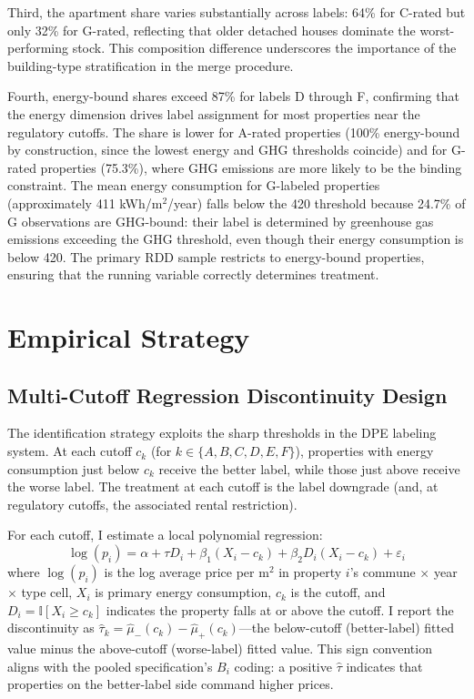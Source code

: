 \documentclass[12pt]{article}
\newcommand{\ind}{\mathbb{I}}
\begin{document}
Third, the apartment share varies substantially across labels: 64\% for C-rated but only 32\% for G-rated, reflecting that older detached houses dominate the worst-performing stock. This composition difference underscores the importance of the building-type stratification in the merge procedure.

Fourth, energy-bound shares exceed 87\% for labels D through F, confirming that the energy dimension drives label assignment for most properties near the regulatory cutoffs. The share is lower for A-rated properties (100\% energy-bound by construction, since the lowest energy and GHG thresholds coincide) and for G-rated properties (75.3\%), where GHG emissions are more likely to be the binding constraint. The mean energy consumption for G-labeled properties (approximately 411 kWh/m$^2$/year) falls below the 420 threshold because 24.7\% of G observations are GHG-bound: their label is determined by greenhouse gas emissions exceeding the GHG threshold, even though their energy consumption is below 420. The primary RDD sample restricts to energy-bound properties, ensuring that the running variable correctly determines treatment.




\section{Empirical Strategy}

\subsection{Multi-Cutoff Regression Discontinuity Design}

The identification strategy exploits the sharp thresholds in the DPE labeling system. At each cutoff $c_k$ (for $k \in \{A, B, C, D, E, F\}$), properties with energy consumption just below $c_k$ receive the better label, while those just above receive the worse label. The treatment at each cutoff is the label downgrade (and, at regulatory cutoffs, the associated rental restriction).

For each cutoff, I estimate a local polynomial regression:
\begin{equation}
    \log(p_i) = \alpha + \tau D_i + \beta_1 (X_i - c_k) + \beta_2 D_i(X_i - c_k) + \varepsilon_i
    \label{eq:rdd}
\end{equation}
where $\log(p_i)$ is the log average price per m$^2$ in property $i$'s commune $\times$ year $\times$ type cell, $X_i$ is primary energy consumption, $c_k$ is the cutoff, and $D_i = \ind[X_i \geq c_k]$ indicates the property falls at or above the cutoff. I report the discontinuity as $\hat{\tau}_k = \hat{\mu}_-(c_k) - \hat{\mu}_+(c_k)$---the below-cutoff (better-label) fitted value minus the above-cutoff (worse-label) fitted value. This sign convention aligns with the pooled specification's $B_i$ coding: a positive $\hat{\tau}$ indicates that properties on the better-label side command higher prices.
\end{document}
